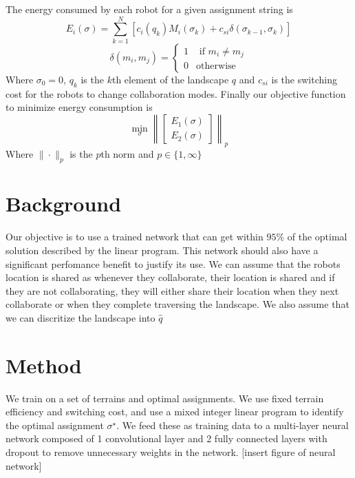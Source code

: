 \documentclass[12pt]{article}
\begin{document}
The energy consumed by each robot for a given assignment string is
\begin{equation}
  E_i(\sigma) = \sum_{ k=1 }^N\left[ c_i(q_k) M_i(\sigma_k)+c_{si} \delta( {\sigma_{k-1},\sigma_k} )\right]
\end{equation}
\begin{equation}
  \delta(m_i,m_j) = \begin{cases}
    1 & \text{ if } m_i \neq m_j \\
    0 & \text{otherwise}
  \end{cases}
\end{equation}
Where $\sigma_0=0$, 
$q_k$ is the $k$th element of the landscape $q$ and $c_{si}$ is the switching cost for the robots to change collaboration modes. Finally our objective function to minimize energy consumption is
\begin{equation}
  \min_\sigma \left\|\begin{bmatrix}
    E_1(\sigma)\\E_2(\sigma)
  \end{bmatrix}\right\|_p
\end{equation}
Where $\|\cdot\|_p$ is the $p$th norm and $p \in \{1,\infty\}$ %
\section{Background}
 Our objective is to use a trained network that can get within $95\%$ of the optimal solution described by the linear program. This network should also have a significant perfomance benefit to justify its use. We can assume that the robots location is shared as whenever they collaborate, their location is shared and if they are not collaborating, they will either share their location when they next collaborate or when they complete traversing the landscape. We also assume that we can discritize the landscape into $\hat{q}$
 \section{Method}
  We train on a set of terrains and optimal assignments. We use fixed terrain efficiency and switching cost, and use a mixed integer linear program to identify the optimal assignment $\sigma^\star$. We feed these as training data to a multi-layer neural network composed of 1 convolutional layer and 2 fully connected layers with dropout to remove unnecessary weights in the network.
 [insert figure of neural network]
 
\end{document}
